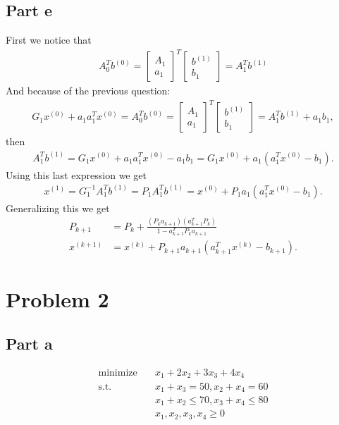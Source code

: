 \documentclass{article}
\begin{document}
\subsection*{Part e}
First we notice that
\begin{align*}
	A_0^Tb^{(0)}=\begin{bmatrix}
	A_1\\	
	a_1
	\end{bmatrix}^T
	\begin{bmatrix}
		b^{(1)}\\
		b_1
	\end{bmatrix}
	=
	A_1^Tb^{(1)}
\end{align*}
And because of the previous question:
\begin{align*}
	G_1x^{(0)}+a_1a_1^Tx^{(0)}=
	A_0^Tb^{(0)}=\begin{bmatrix}
	A_1\\	
	a_1
	\end{bmatrix}^T
	\begin{bmatrix}
		b^{(1)}\\
		b_1
	\end{bmatrix}
	=
	A_1^Tb^{(1)}+a_1b_1,
\end{align*}
then
\begin{align*}
A_1^Tb^{(1)} = G_1x^{(0)}+a_1a_1^Tx^{(0)}-a_1b_1=G_1x^{(0)}+a_1(a_1^Tx^{(0)}-b_1).
\end{align*}
Using this last expression we get
\begin{align*}
	x^{(1)}=G_1^{-1}A_1^Tb^{(1)}=P_1A_1^Tb^{(1)}=x^{(0)}+P_1a_1(a_1^Tx^{(0)}-b_1).
\end{align*}
Generalizing this we get
\begin{align*}
	P_{k+1}&=P_k+\frac{(P_ka_{k+1})(a_{k+1}^TP_k)}{1-a_{k+1}^TP_ka_{k+1}}\\
	x^{(k+1)}&=x^{(k)}+P_{k+1}a_{k+1}(a_{k+1}^Tx^{(k)}-b_{k+1}).
\end{align*}
\section*{Problem 2}
\subsection*{Part a}
\[
\begin{aligned}
\text{minimize}\quad & x_1+2x_2+3x_3+4x_4\\
\textrm{s.t.} \quad &x_1+x_3=50,x_2+x_4=60\\
  &x_1+x_2\leq70,x_3+x_4\leq80\\
  &x_1,x_2,x_3,x_4\geq0\\
\end{aligned}
\]
\end{document}
